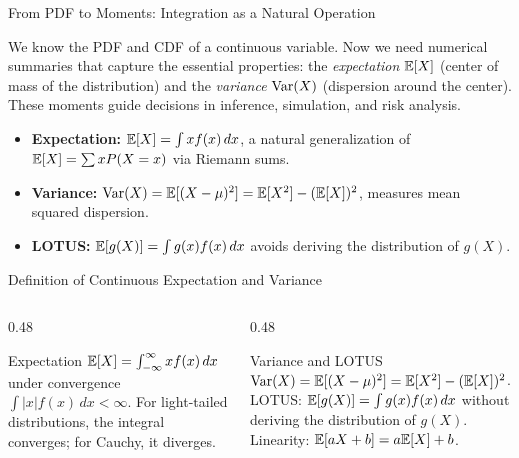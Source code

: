 \documentclass[aspectratio=169,xcolor={dvipsnames,table}]{beamer}
\begin{document}
\begin{frame}{From PDF to Moments: Integration as a Natural Operation}
	\footnotesize
	\begin{motivacion}
		We know the PDF and CDF of a continuous variable. Now we need numerical summaries that capture the essential properties: the \emph{expectation} $\mathbb{E}[X]$ (center of mass of the distribution) and the \emph{variance} $\operatorname{Var}(X)$ (dispersion around the center). These moments guide decisions in inference, simulation, and risk analysis.
	\end{motivacion}
	\vspace{0.15cm}
	\pause
	\begin{itemize}\itemsep=0.1cm
		\item \textbf{Expectation:} $\mathbb{E}[X] = \int x f(x)\,dx$, a natural generalization of $\mathbb{E}[X] = \sum x P(X=x)$ via Riemann sums. \pause
		\item \textbf{Variance:} $\operatorname{Var}(X) = \mathbb{E}[(X - \mu)^{2}] = \mathbb{E}[X^{2}] - (\mathbb{E}[X])^{2}$, measures mean squared dispersion. \pause
		\item \textbf{LOTUS:} $\mathbb{E}[g(X)] = \int g(x) f(x)\,dx$ avoids deriving the distribution of $g(X)$.
	\end{itemize}
\end{frame}

\begin{frame}{Definition of Continuous Expectation and Variance}
	\vspace{-0.15cm}
	\begin{columns}[T]
		\begin{column}{0.48\textwidth}
			\begin{block}{Expectation}
				\footnotesize
				$\mathbb{E}[X] = \int_{-\infty}^{\infty} x f(x)\,dx$ under convergence $\int |x| f(x)\,dx < \infty$. For light-tailed distributions, the integral converges; for Cauchy, it diverges.
			\end{block}
		\end{column}
		\begin{column}{0.48\textwidth}
			\begin{alertblock}{Variance and LOTUS}
				\footnotesize
				$\operatorname{Var}(X) = \mathbb{E}[(X-\mu)^{2}] = \mathbb{E}[X^{2}] - (\mathbb{E}[X])^{2}$. LOTUS: $\mathbb{E}[g(X)] = \int g(x) f(x)\,dx$ without deriving the distribution of $g(X)$. Linearity: $\mathbb{E}[aX+b] = a\mathbb{E}[X]+b$.
			\end{alertblock}
		\end{column}
	\end{columns}
\end{frame}
\end{document}
